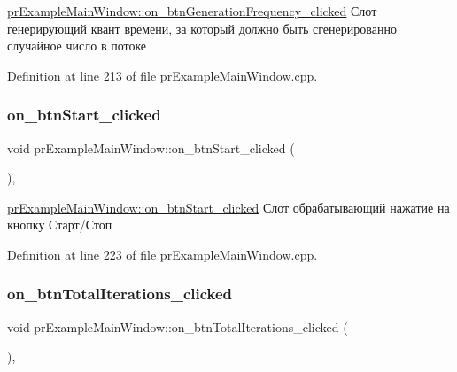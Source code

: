 \hyperlink{classpr_example_main_window_ae70fafa427f7bf3c30683ad3e3760d12}{pr\+Example\+Main\+Window\+::on\+\_\+btn\+Generation\+Frequency\+\_\+clicked} Слот генерирующий квант времени, за который должно быть сгенерированно случайное число в потоке 



Definition at line 213 of file pr\+Example\+Main\+Window.\+cpp.

\mbox{\label{classpr_example_main_window_a9c6a9bfaa53a655479b13d8da936c9ab}} 
\subsubsection{\texorpdfstring{on\+\_\+btn\+Start\+\_\+clicked}{on\_btnStart\_clicked}}
{\footnotesize\ttfamily void pr\+Example\+Main\+Window\+::on\+\_\+btn\+Start\+\_\+clicked (\begin{DoxyParamCaption}{ }\end{DoxyParamCaption})\hspace{0.3cm}{\ttfamily [private]}, {\ttfamily [slot]}}



\hyperlink{classpr_example_main_window_a9c6a9bfaa53a655479b13d8da936c9ab}{pr\+Example\+Main\+Window\+::on\+\_\+btn\+Start\+\_\+clicked} Слот обрабатывающий нажатие на кнопку Старт/Стоп 



Definition at line 223 of file pr\+Example\+Main\+Window.\+cpp.

\mbox{\label{classpr_example_main_window_a3868049ba73b562b78b1518114bd26b0}} 
\subsubsection{\texorpdfstring{on\+\_\+btn\+Total\+Iterations\+\_\+clicked}{on\_btnTotalIterations\_clicked}}
{\footnotesize\ttfamily void pr\+Example\+Main\+Window\+::on\+\_\+btn\+Total\+Iterations\+\_\+clicked (\begin{DoxyParamCaption}{ }\end{DoxyParamCaption})\hspace{0.3cm}{\ttfamily [private]}, {\ttfamily [slot]}}



